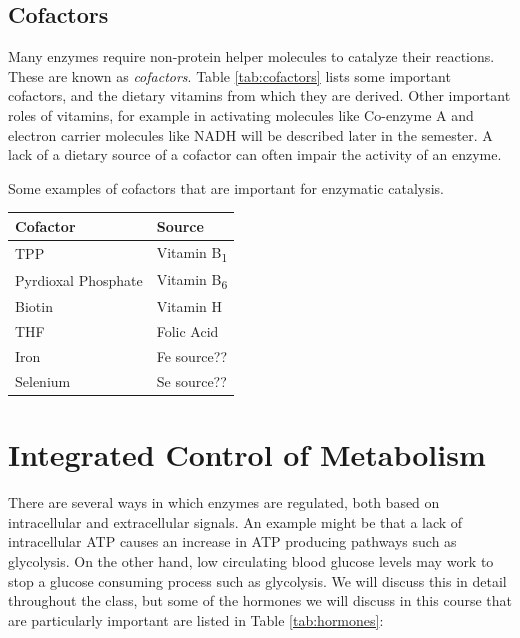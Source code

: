 \documentclass{tufte-handout}
\begin{document}
\subsection{Cofactors}
Many enzymes require non-protein helper molecules to catalyze their reactions.  These are known as \emph{cofactors}.  Table \ref{tab:cofactors} lists some important cofactors, and the dietary vitamins from which they are derived.  Other important roles of vitamins, for example in activating molecules like Co-enzyme A and electron carrier molecules like NADH will be described later in the semester.  A lack of a dietary source of a cofactor can often impair the activity of an enzyme.

\begin{margintable}
\caption{Some examples of cofactors that are important for enzymatic catalysis.}
\label{tab:cofactors}
\begin{tabular}{@{}ll@{}}
 \textbf{Cofactor}  & \textbf{Source}           \\ \midrule
TPP & Vitamin B\textsubscript{1} \\
Pyrdioxal Phosphate & Vitamin B\textsubscript{6} \\
Biotin & Vitamin H \\
THF & Folic Acid \\
Iron &  Fe source?? \\ 
Selenium & Se source?? \\ \bottomrule
\end{tabular}
\end{margintable}

\section{Integrated Control of Metabolism}

There are several ways in which enzymes are regulated, both based on intracellular and extracellular signals.  An example might be that a lack of intracellular ATP causes an increase in ATP producing pathways such as glycolysis.  On the other hand, low circulating blood glucose levels may work to stop a glucose consuming process such as glycolysis.  We will discuss this in detail throughout the class, but some of the hormones we will discuss in this course that are particularly important are listed in Table \ref{tab:hormones}:
\end{document}
